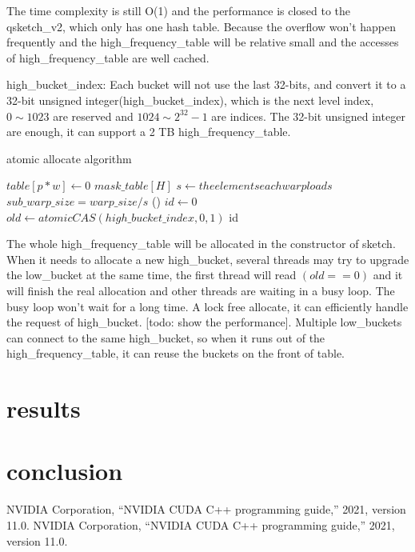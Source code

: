 \documentclass[conference]{IEEEtran}
\begin{document}
The time complexity is still O(1) and the performance is closed to the qsketch\_v2, which only has one hash table. Because the overflow won’t happen frequently and the high\_frequency\_table will be relative small and the accesses of high\_frequency\_table are well cached.

high\_bucket\_index:
Each bucket will not use the last 32-bits, and convert it to a 32-bit unsigned integer(high\_bucket\_index), which is the next level index, $0 \sim 1023$ are reserved and 
$1024 \sim 2 ^ {32} - 1$
are indices. 
The 32-bit unsigned integer are enough, it can support a 2 TB high\_frequency\_table.

\begin{algorithm}
    \DontPrintSemicolon
    \caption{atomic allocate algorithm}
    $table[p * w] \longleftarrow 0$\;
    $mask\_table[H]$\;
    $s \longleftarrow the elements each warp loads$\;
    $sub\_warp\_size = warp\_size / s $\;
\Fn(){}
{
    $id \leftarrow 0$\;
    $old \leftarrow atomicCAS(high\_bucket\_index, 0, 1)$\;
    \KwRet id\;
}
\end{algorithm}


The whole high\_frequency\_table will be allocated in the constructor of sketch. When it needs to allocate a new high\_bucket, several threads may try to upgrade the low\_bucket at the same time, the first thread will read $(old == 0)$ and it will finish the real allocation and other threads are waiting in a busy loop. The busy loop won't wait for a long time.
A lock free allocate, it can efficiently handle the request of high\_bucket. [todo: show the performance].
Multiple low\_buckets can connect to the same high\_bucket, so when it runs out of the high\_frequency\_table, it can reuse the buckets on the front of table.
\section{results}
\section{conclusion}

\begin{thebibliography}{00}
 NVIDIA Corporation, “NVIDIA CUDA C++ programming guide,” 2021, version 11.0.
 NVIDIA Corporation, “NVIDIA CUDA C++ programming guide,” 2021, version 11.0.

\end{thebibliography}
\end{document}
